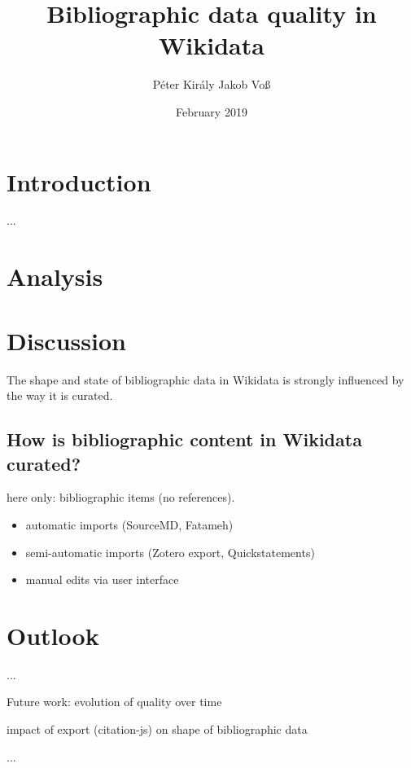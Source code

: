 \documentclass[prodmode,acmtecs]{acmsmall}
\title{Bibliographic data quality in Wikidata}
\author{Péter Király
\affil{GWDG}
Jakob Voß
\affil{VZG}}
\date{February 2019}
\begin{document}
\maketitle

\section{Introduction}
...

\section{Analysis}



\section{Discussion}

The shape and state of bibliographic data in Wikidata is strongly influenced by the way it is curated.

\subsection{How is bibliographic content in Wikidata curated?}

here only: bibliographic items (no references).

\begin{itemize}
  \item automatic imports (SourceMD, Fatameh)
  \item semi-automatic imports (Zotero export, Quickstatements)
  \item manual edits via user interface
\end{itemize}

\section{Outlook}
...

Future work: evolution of quality over time

impact of export (citation-js) on shape of bibliographic data

...


\nocite{Zaveri2015}

\end{document}
